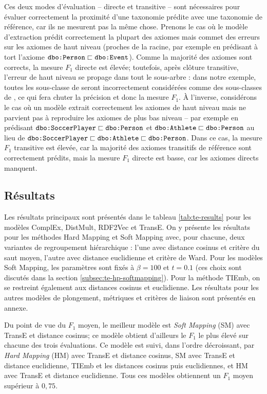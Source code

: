 Ces deux modes d'évaluation – directe et transitive – sont nécessaires pour évaluer correctement la proximité d'une taxonomie prédite avec une taxonomie de référence, car ils ne mesurent pas la même chose. Prenons le cas où le modèle d'extraction prédit correctement la plupart des axiomes mais commet des erreurs sur les axiomes de haut niveau (proches de la racine, par exemple en prédisant à tort l'axiome $\texttt{dbo:Person} \sqsubset \texttt{dbo:Event}$). Comme la majorité des axiomes sont corrects, la mesure $F_1$ directe est élevée; toutefois, après clôture transitive, l'erreur de haut niveau se propage dans tout le sous-arbre : dans notre exemple, toutes les sous-classe de  seront incorrectement considérées comme des sous-classes de , ce qui fera chuter la précision et donc la mesure $F_1$. À l'inverse, considérons le cas où un modèle extrait correctement les axiomes de haut niveau mais ne parvient pas à reproduire les axiomes de plus bas niveau – par exemple en prédisant $\texttt{dbo:SoccerPlayer} \sqsubset \texttt{dbo:Person}$ et $\texttt{dbo:Athlete} \sqsubset \texttt{dbo:Person}$ au lieu de $\texttt{dbo:SoccerPlayer} \sqsubset \texttt{dbo:Athlete} \sqsubset \texttt{dbo:Person}$. Dans ce cas, la mesure $F_1$ transitive est élevée, car la majorité des axiomes transitifs de référence sont correctement prédits, mais la mesure $F_1$ directe est basse, car les axiomes directs manquent. %


\subsection{Résultats}
\label{subsec:te-results}

Les résultats principaux sont présentés dans le tableau \ref{tab:te-results} pour les modèles ComplEx, DistMult, RDF2Vec et TransE. On y présente les résultats pour les méthodes Hard Mapping et Soft Mapping avec, pour chacune, deux variantes de regroupement hiérarchique : l'une avec distance cosinus et critère du saut moyen, l'autre avec distance euclidienne et critère de Ward. Pour les modèles Soft Mapping, les paramètres sont fixés à $\beta = 100$ et $t=0.1$ (ces choix sont discutés dans la section \ref{subsec:te-hp-softmapping}). Pour la méthode TIEmb, on se restreint également aux distances cosinus et euclidienne. Les résultats pour les autres modèles de plongement, métriques et critères de liaison sont présentés en annexe.

Du point de vue du $F_1$ moyen, le meilleur modèle est \textit{Soft Mapping} (SM) avec TransE et distance cosinus; ce modèle obtient d'ailleurs le $F_1$ le plus élevé sur chacune des trois évaluations. Ce modèle est suivi, dans l'ordre décroissant, par \textit{Hard Mapping} (HM) avec TransE et distance cosinus, SM avec TransE et distance euclidienne, TIEmb et les distances cosinus puis euclidiennes, et HM avec TransE et distance euclidienne. Tous ces modèles obtiennent un $F_1$ moyen supérieur à $0,75$.

